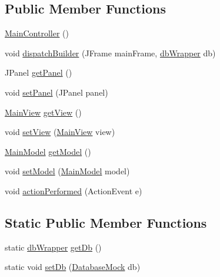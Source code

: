\subsection*{Public Member Functions}
\begin{DoxyCompactItemize}
\item 
\mbox{\hyperlink{classcom_1_1_b_n_u_1_1pages_1_1main_1_1_main_controller_ad7f67acb94f03572081adc36193fa2a2}{Main\+Controller}} ()
\item 
void \mbox{\hyperlink{classcom_1_1_b_n_u_1_1pages_1_1main_1_1_main_controller_aefa7de8d8f8f0d6f2e26b97107f401a6}{dispatch\+Builder}} (J\+Frame main\+Frame, \mbox{\hyperlink{interfacecom_1_1_b_n_u_1_1database_1_1db_wrapper}{db\+Wrapper}} db)
\item 
J\+Panel \mbox{\hyperlink{classcom_1_1_b_n_u_1_1pages_1_1main_1_1_main_controller_a9bd2b36ff4f2c93c930236d6fcdcda0e}{get\+Panel}} ()
\item 
void \mbox{\hyperlink{classcom_1_1_b_n_u_1_1pages_1_1main_1_1_main_controller_a12329af389f8e9c4ff7cd4a7fabde6c5}{set\+Panel}} (J\+Panel panel)
\item 
\mbox{\hyperlink{classcom_1_1_b_n_u_1_1pages_1_1main_1_1_main_view}{Main\+View}} \mbox{\hyperlink{classcom_1_1_b_n_u_1_1pages_1_1main_1_1_main_controller_a14c0984a24419e2665af546a154ee68a}{get\+View}} ()
\item 
void \mbox{\hyperlink{classcom_1_1_b_n_u_1_1pages_1_1main_1_1_main_controller_aaaf8441764f8c8eb9a91d65eb2a5ea43}{set\+View}} (\mbox{\hyperlink{classcom_1_1_b_n_u_1_1pages_1_1main_1_1_main_view}{Main\+View}} view)
\item 
\mbox{\hyperlink{classcom_1_1_b_n_u_1_1pages_1_1main_1_1_main_model}{Main\+Model}} \mbox{\hyperlink{classcom_1_1_b_n_u_1_1pages_1_1main_1_1_main_controller_a15ce8dd5113da52d03e7f439d84ad47f}{get\+Model}} ()
\item 
void \mbox{\hyperlink{classcom_1_1_b_n_u_1_1pages_1_1main_1_1_main_controller_a5145aad3c0d562bf0117c08a930d39ea}{set\+Model}} (\mbox{\hyperlink{classcom_1_1_b_n_u_1_1pages_1_1main_1_1_main_model}{Main\+Model}} model)
\item 
void \mbox{\hyperlink{classcom_1_1_b_n_u_1_1pages_1_1main_1_1_main_controller_a585cb8a6b98eb627d853307e730f6f0e}{action\+Performed}} (Action\+Event e)
\end{DoxyCompactItemize}
\subsection*{Static Public Member Functions}
\begin{DoxyCompactItemize}
\item 
static \mbox{\hyperlink{interfacecom_1_1_b_n_u_1_1database_1_1db_wrapper}{db\+Wrapper}} \mbox{\hyperlink{classcom_1_1_b_n_u_1_1pages_1_1main_1_1_main_controller_a28a7ac9d61c5fc94faef88128b158dde}{get\+Db}} ()
\item 
static void \mbox{\hyperlink{classcom_1_1_b_n_u_1_1pages_1_1main_1_1_main_controller_a79e5029f5cdebc7469bd1e799a814da7}{set\+Db}} (\mbox{\hyperlink{classcom_1_1_b_n_u_1_1database_1_1_database_mock}{Database\+Mock}} db)
\end{DoxyCompactItemize}
